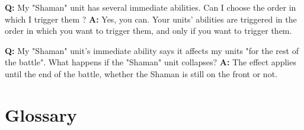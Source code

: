 \documentclass[a4paper]{article}
\begin{document}
    \hspace{-2em}
    \textbf{Q:} My "Shaman" unit has several immediate abilities.
    Can I choose the order in which I trigger them ?
    \newline
    \textbf{A:} Yes, you can. Your units' abilities are triggered in the order in which
    you want to trigger them, and only if you want to trigger them.
    
    \hspace{-2em}
    \textbf{Q:} My "Shaman" unit's immediate ability says it affects my units
    "for the rest of the battle". What happens if the "Shaman" unit collapses?
    \newline
    \textbf{A:} The effect applies until the end of the battle,
    whether the Shaman is still on the front or not.
    
    
\newpage
\section{Glossary}
  
\end{document}
